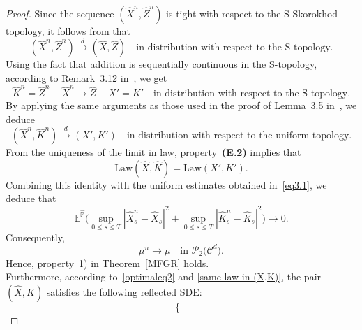 \documentclass[11pt,amsfonts]{article}
\theoremstyle{plain}
\theoremstyle{assumpstyle}
\numberwithin{equation}{section}
\numberwithin{theorem}{section}
\numberwithin{proposition}{section}
\numberwithin{definition}{section}
\numberwithin{remark}{section}
\numberwithin{corollary}{section}
\numberwithin{lemma}{section}
\begin{document}
\begin{proof}
Since the sequence $ (\hat{X}^n, \hat{Z}^n) $ is tight with respect to the S-Skorokhod topology, it follows from \cite[Theorem 3.5]{jakub} that
\begin{equation*}
(\hat{X}^n, \hat{Z}^n) \xrightarrow{d} (\hat{X}, \hat{Z}) \quad \text{in distribution with respect to the S-topology}.
\end{equation*}
Using the fact that addition is sequentially continuous in the S-topology, according to Remark~3.12 in~\cite{jakub}, we get
\begin{equation*}
\hat{K}^n = \hat{Z}^n - \hat{X}^n \to \hat{Z} - X' = K' \quad \text{in distribution with respect to the S-topology}.
\end{equation*}
By applying the same arguments as those used in the proof of Lemma~3.5 in~\cite{bahlali-PDE}, we deduce 
\begin{equation*}\label{adjointopt}
(\hat{X}^n, \hat{K}^n) \xrightarrow{d} (X', K')
\quad \text{in distribution with respect to the uniform topology}.
\end{equation*}
From the uniqueness of the limit in law, property~\textbf{(E.2)} implies that
\begin{equation}\label{same-law-in (X,K)}
\mathrm{Law}(\hat{X}, \hat{K}) = \mathrm{Law}(X', K').
\end{equation}
Combining this identity with the uniform estimates obtained in~\eqref{eq3.1}, we deduce that
\begin{equation*}
\mathbb{E}^{\hat{\mathbb{P}}}
\Bigg(
\sup_{0 \le s \le T} 
|\hat{X}^n_s - \hat{X}_s|^2
+
\sup_{0 \le s \le T} 
|\hat{K}^n_s - \hat{K}_s|^2
\Bigg)
\longrightarrow 0.
\end{equation*}
Consequently,
\begin{equation*}
\mu^n \longrightarrow \mu 
\quad \text{in } \mathcal{P}_2\big(\mathcal{C}^d\big).
\end{equation*}
Hence, property~1) in Theorem~\ref{MFGR} holds.\\
Furthermore, according to~\eqref{optimaleq2} and \eqref{same-law-in (X,K)}, 
the pair $(\hat{X}, \hat{K})$ satisfies the following reflected SDE:
\begin{equation}\label{reflectedSDE}
\begin{cases}

\end{cases}
\end{equation}
\end{proof}
\end{document}
